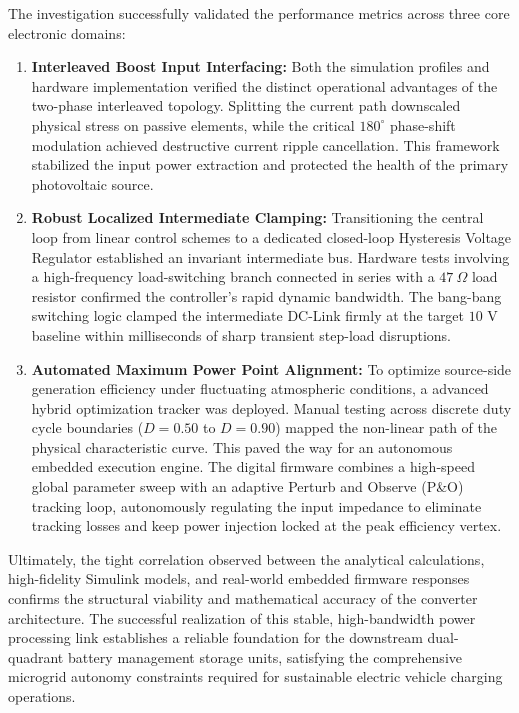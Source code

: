 The investigation successfully validated the performance metrics across three core electronic domains:
\begin{enumerate}
    \item \textbf{Interleaved Boost Input Interfacing:} Both the simulation profiles and hardware implementation verified the distinct operational advantages of the two-phase interleaved topology. Splitting the current path downscaled physical stress on passive elements, while the critical $180^\circ$ phase-shift modulation achieved destructive current ripple cancellation. This framework stabilized the input power extraction and protected the health of the primary photovoltaic source.
    \newpage
    \item \textbf{Robust Localized Intermediate Clamping:} Transitioning the central loop from linear control schemes to a dedicated closed-loop Hysteresis Voltage Regulator established an invariant intermediate bus. Hardware tests involving a high-frequency load-switching branch connected in series with a $47\ \Omega$ load resistor confirmed the controller's rapid dynamic bandwidth. The bang-bang switching logic clamped the intermediate DC-Link firmly at the target $10\text{ V}$ baseline within milliseconds of sharp transient step-load disruptions.
    \item \textbf{Automated Maximum Power Point Alignment:} To optimize source-side generation efficiency under fluctuating atmospheric conditions, a advanced hybrid optimization tracker was deployed. Manual testing across discrete duty cycle boundaries ($D = 0.50$ to $D = 0.90$) mapped the non-linear path of the physical characteristic curve. This paved the way for an autonomous embedded execution engine. The digital firmware combines a high-speed global parameter sweep with an adaptive Perturb and Observe (P\&O) tracking loop, autonomously regulating the input impedance to eliminate tracking losses and keep power injection locked at the peak efficiency vertex.
\end{enumerate}

Ultimately, the tight correlation observed between the analytical calculations, high-fidelity Simulink models, and real-world embedded firmware responses confirms the structural viability and mathematical accuracy of the converter architecture. The successful realization of this stable, high-bandwidth power processing link establishes a reliable foundation for the downstream dual-quadrant battery management storage units, satisfying the comprehensive microgrid autonomy constraints required for sustainable electric vehicle charging operations.